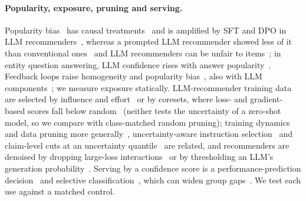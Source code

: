 \paragraph{Popularity, exposure, pruning and serving.}
Popularity bias~\citep{abdollahpouri2017controlling} has causal treatments~\citep{wei2021macr,zhang2021pda} and is amplified by SFT and DPO
in LLM recommenders~\citep{gao2025flower,gao2025sprec}, whereas a prompted LLM recommender showed less of it than conventional
ones~\citep{lichtenberg2024popularity} and LLM recommenders can be unfair to items~\citep{jiang2024itemfairness}; in entity question
answering, LLM confidence rises with answer popularity~\citep{ni2026popular}. Feedback loops raise homogeneity and popularity
bias~\citep{chaney2018feedback,mansoury2020feedback}, also with LLM components~\citep{park2026echotrace}; we measure exposure statically.
LLM-recommender training data are selected by influence and effort~\citep{lin2024dealrec} or by coresets, where loss- and gradient-based scores
fall below random~\citep{mei2025goracs} (neither tests the uncertainty of a zero-shot model, so we compare with class-matched random
pruning); training dynamics and data pruning more generally~\citep{swayamdipta2020cartography,sorscher2022pruning}, uncertainty-aware
instruction selection~\citep{liu2024selectit} and claim-level cuts at an uncertainty quantile~\citep{wu2025unit} are related, and
recommenders are denoised by dropping large-loss interactions~\citep{wang2021tce} or by thresholding an LLM's generation
probability~\citep{wang2026llm4dsr}. Serving by a confidence score is a performance-prediction decision~\citep{bellogin2011predicting}
and selective classification~\citep{geifman2017selective}, which can widen group gaps~\citep{jones2021selective}. We test each use
against a matched control.
